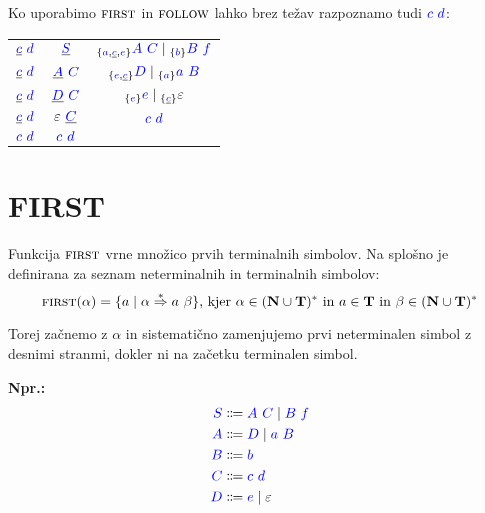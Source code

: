 \documentclass{article}
\newcommand{\Ex}{\textbf{Npr.:}\ }
\newcommand{\FIRST}{\textsc{first}}
\newcommand{\FOLLOW}{\textsc{follow}}
\newcommand{\Set}[1]{\mathbf{#1}}
\newcommand{\Symbol}[1]{\textcolor{blue}{#1}}
\newcommand{\Terminals}{\Set{T}}
\newcommand{\NonTerminals}{\Set{N}}
\newcommand{\Null}{\varepsilon}
\newcommand{\Arrow}{\Coloneq}
\newcommand{\DeriveStar}{\overset{\ast}{\Rightarrow}}
\newcommand{\Seq}{\ }
\newcommand{\Union}{\mathrel{|}}
\newcommand{\Kleene}[1]{#1^\ast}
\newcommand{\Lookahead}[1]{{}_{\{{#1}\}}}
\begin{document}
Ko uporabimo $\FIRST$ in $\FOLLOW$ lahko brez težav razpoznamo tudi $\Symbol{c} \Seq \Symbol{d}$:
\begin{center}
\begin{tabular}{|c|c|c|}
  \hline
  $\underline{\Symbol{c}} \Seq \Symbol{d}$ & $\underline{\Symbol{S}}$ & $\Lookahead{\Symbol{a}, \underline{\Symbol{c}}, \Symbol{e}} \Symbol{A} \Seq \Symbol{C} \Union \Lookahead{\Symbol{b}} \Symbol{B} \Seq \Symbol{f}$ \\ 
  $\underline{\Symbol{c}} \Seq \Symbol{d}$ & $\underline{\Symbol{A}} \Seq \Symbol{C}$ & $\Lookahead{\Symbol{e}, \underline{\Symbol{c}}} \Symbol{D} \Union \Lookahead{\Symbol{a}} \Symbol{a} \Seq \Symbol{B}$ \\ 
  $\underline{\Symbol{c}} \Seq \Symbol{d}$ & $\underline{\Symbol{D}} \Seq \Symbol{C}$ & $\Lookahead{\Symbol{e}} \Symbol{e} \Union \Lookahead{\underline{\Symbol{c}}} \Null$ \\ 
  $\underline{\Symbol{c}} \Seq \Symbol{d}$ & $\Null \Seq \underline{\Symbol{C}}$ & $\Symbol{c} \Seq \Symbol{d}$ \\ 
  \hline
  $\Symbol{c} \Seq \Symbol{d}$ & $\Symbol{c} \Seq \Symbol{d}$ & \\ 
  \hline
\end{tabular}
\end{center}

\section{FIRST}

Funkcija $\FIRST$ vrne množico prvih terminalnih simbolov.
Na splošno je definirana za seznam neterminalnih in terminalnih simbolov:
\begin{equation*}
  \FIRST(\alpha) = \{ a \mid \alpha \DeriveStar a \Seq \beta \} \text{, kjer } \alpha \in \Kleene{(\NonTerminals \cup \Terminals)} \text{ in } a \in \Terminals \text{ in } \beta \in \Kleene{(\NonTerminals \cup \Terminals)}
\end{equation*}

Torej začnemo z $\alpha$ in sistematično zamenjujemo prvi neterminalen simbol z desnimi stranmi, dokler ni na začetku terminalen simbol.

\Ex
\begin{equation*}
  \begin{aligned}
    \Symbol{S} &\Arrow \Symbol{A} \Seq \Symbol{C} \Union \Symbol{B} \Seq \Symbol{f} \\
    \Symbol{A} &\Arrow \Symbol{D} \Union \Symbol{a} \Seq \Symbol{B} \\
    \Symbol{B} &\Arrow \Symbol{b}\\
    \Symbol{C} &\Arrow \Symbol{c} \Seq \Symbol{d}\\
    \Symbol{D} &\Arrow \Symbol{e} \Union \Null
  \end{aligned}
\end{equation*}
\end{document}
